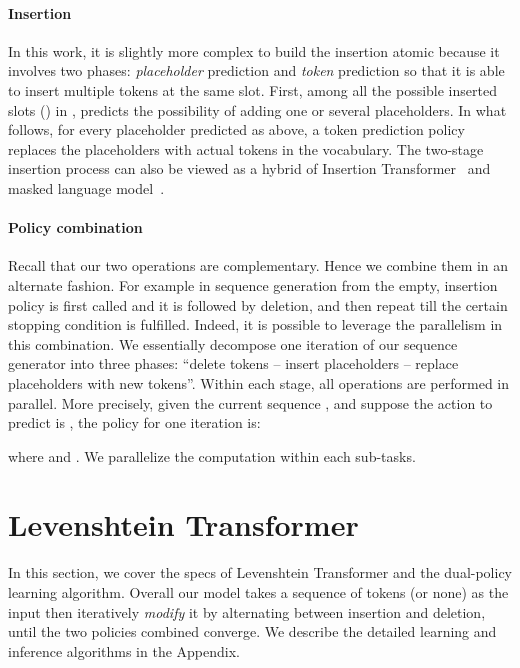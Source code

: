 \documentclass{article}
\begin{document}
\paragraph{Insertion} In this work, it is slightly more complex to build the insertion atomic because it involves two phases: \emph{placeholder} prediction and \emph{token} prediction so that it is able to insert multiple tokens at the same slot.
First, among all the possible inserted slots () in ,  predicts the possibility of adding one or several placeholders.
In what follows, for every placeholder predicted as above, a token prediction policy  replaces the placeholders with actual tokens in the vocabulary.
The two-stage insertion process can also be viewed as a hybrid of Insertion Transformer~\citep{stern2019insertion} and masked language model~\citep[MLM,][]{devlin2018bert,levy2019constant}.



\paragraph{Policy combination}
Recall that our two operations are complementary. Hence we combine them in an alternate fashion. For example in sequence generation from the empty, insertion policy is first called and it is followed by deletion, and then repeat till the certain stopping condition is fulfilled.
Indeed, it is possible to leverage the parallelism in this combination. We essentially decompose one iteration of our sequence generator into three phases: ``delete tokens -- insert placeholders -- replace placeholders with new tokens''. Within each stage, all operations are performed in parallel. More precisely, given the current sequence , and suppose the action to predict is , the policy for one iteration is:

where  and . We parallelize the computation within each sub-tasks.




\section{Levenshtein Transformer}
In this section, we cover the specs of Levenshtein Transformer and the dual-policy learning algorithm.
Overall our model takes a sequence of tokens (or none) as the input then iteratively \emph{modify} it by alternating between insertion and deletion, until the two policies combined converge. We describe the detailed learning and inference algorithms in the Appendix.
\end{document}
